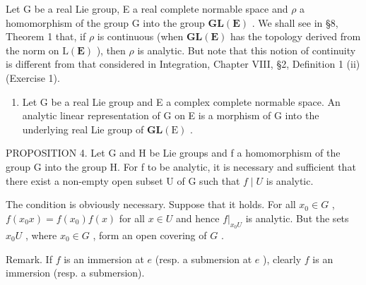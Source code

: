 Let G be a real Lie group, E a real complete normable space and \(\rho\) a homomorphism of the group G into the group \(\mathbf{GL}(\mathbf{E})\) . We shall see in §8, Theorem 1 that, if \(\rho\) is continuous (when \(\mathbf{GL}(\mathbf{E})\) has the topology derived from the norm on \(\mathrm{L}(\mathbf{E})\) ), then \(\rho\) is analytic. But note that this notion of continuity is different from that considered in Integration, Chapter VIII, §2, Definition 1 (ii) (Exercise 1).

\begin{enumerate}
\def\labelenumi{(\arabic{enumi})}
\setcounter{enumi}{3}
\tightlist
\item
  Let G be a real Lie group and E a complex complete normable space. An analytic linear representation of G on E is a morphism of G into the underlying real Lie group of \(\mathbf{GL}(\mathrm{E})\) .
\end{enumerate}

PROPOSITION 4. Let G and H be Lie groups and f a homomorphism of the group G into the group H. For f to be analytic, it is necessary and sufficient that there exist a non-empty open subset U of G such that \(f \mid U\) is analytic.

The condition is obviously necessary. Suppose that it holds. For all \(x_0 \in G\) , \(f(x_0x) = f(x_0)f(x)\) for all \(x \in U\) and hence \(f|_{x_0U}\) is analytic. But the sets \(x_0U\) , where \(x_0 \in G\) , form an open covering of \(G\) .

Remark. If \(f\) is an immersion at \(e\) (resp. a submersion at \(e\) ), clearly \(f\) is an immersion (resp. a submersion).

